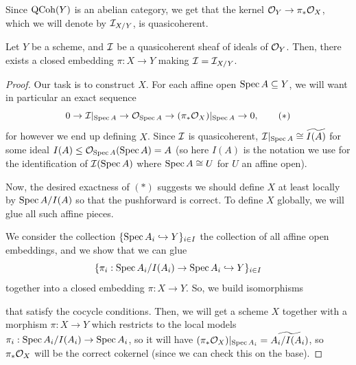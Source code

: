 \documentclass[12pt]{article}
\begin{document}
\begin{rmk}
    Since $\mathrm{QCoh}(Y)$ is an abelian category, we get that the kernel $\mathcal{O}_Y \to \pi_* \mathcal{O}_X$, which we will denote by $\mathcal{I}_{X/Y}$, is quasicoherent.
\end{rmk}

\begin{thm}
    Let $Y$ be a scheme, and $\mathcal{I}$ be a quasicoherent sheaf of ideals of $\mathcal{O}_Y$. Then, there exists a closed embedding $\pi: X\to Y$ making $\mathcal{I} = \mathcal{I}_{X/Y}$.
\end{thm}

\begin{proof}
    Our task is to construct $X$. For each affine open $\operatorname{Spec} A \subseteq Y$, we will want in particular an exact sequence
    \[0\to \mathcal{I}|_{\operatorname{Spec} A} \to \mathcal{O}_{\operatorname{Spec} A} \to (\pi_*\mathcal{O}_X)|_{\operatorname{Spec} A} \to 0, \tag{$*$}\]
    for however we end up defining $X$. Since $\mathcal{I}$ is quasicoherent, $\mathcal{I}|_{\operatorname{Spec} A} \cong \widetilde{I(A)}$ for some ideal $I(A)\leq \mathcal{O}_{\operatorname{Spec} A}(\operatorname{Spec} A) = A$ (so here $I(A)$ is the notation we use for the identification of $\mathcal{I}(\operatorname{Spec} A)$ where $\operatorname{Spec} A\cong U$ for $U$ an affine open).

    Now, the desired exactness of $(*)$ suggests we should define $X$ at least locally by $\operatorname{Spec} A/I(A)$ so that the pushforward is correct. To define $X$ globally, we will glue all such affine pieces.

    We consider the collection $\{\operatorname{Spec} A_i \hookrightarrow Y\}_{i\in I}$ the collection of all affine open embeddings, and we show that we can glue
    \[\{\pi_i: \operatorname{Spec} A_i/I(A_i) \to \operatorname{Spec} A_i \hookrightarrow Y\}_{i\in I}\]
    together into a closed embedding $\pi: X\to Y$. So, we build isomorphisms
    \begin{center}
    \end{center}
    that satisfy the cocycle conditions. Then, we will get a scheme $X$ together with a morphism $\pi: X\to Y$ which restricts to the local models $\pi_i: \operatorname{Spec} A_i/I(A_i) \to \operatorname{Spec} A_i$, so it will have $(\pi_* \mathcal{O}_X)|_{\operatorname{Spec} A_i} = \widetilde{A_i/I(A_i)}$, so $\pi_* \mathcal{O}_X$ will be the correct cokernel (since we can check this on the base).


\end{proof}
\end{document}
